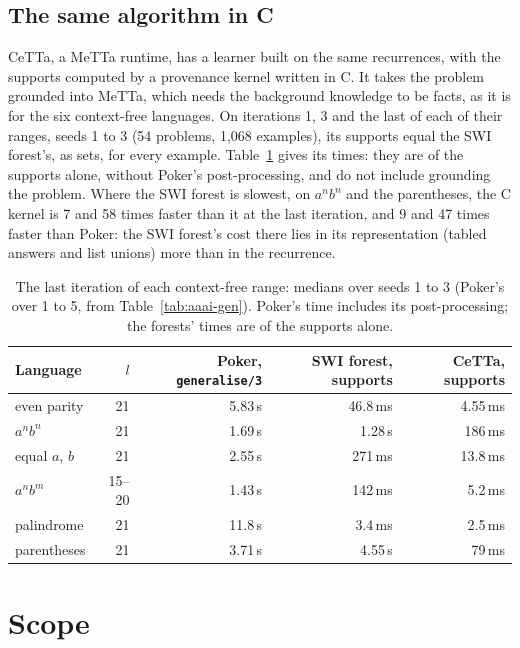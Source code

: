 \documentclass[11pt]{article}
\begin{document}
\subsection{The same algorithm in C}

CeTTa, a MeTTa runtime, has a learner built on the same recurrences, with the
supports computed by a provenance kernel written in C. It takes the problem grounded
into MeTTa, which needs the background knowledge to be facts, as it is for the six
context-free languages. On iterations 1, 3 and the last of each of their ranges,
seeds 1 to 3 (54 problems, 1,068 examples), its supports equal the SWI forest's,
as sets, for every example. Table~\ref{tab:cetta} gives its times: they are of the
supports alone, without Poker's post-processing, and do not include grounding the
problem. Where the SWI forest is slowest, on $a^nb^n$ and the parentheses, the C
kernel is 7 and 58 times faster than it at the last iteration, and 9 and 47 times
faster than Poker: the SWI forest's cost there lies in its representation (tabled
answers and list unions) more than in the recurrence.

\begin{table}[ht]
\centering
\small
\begin{tabular}{lrrrr}
\toprule
Language & $l$ & Poker, \nolinkurl{generalise/3} & SWI forest, supports & CeTTa, supports\\
\midrule
even parity    & 21 & 5.83\,s & 46.8\,ms & 4.55\,ms\\
$a^nb^n$       & 21 & 1.69\,s & 1.28\,s  & 186\,ms\\
equal $a$, $b$ & 21 & 2.55\,s & 271\,ms  & 13.8\,ms\\
$a^nb^m$       & 15--20 & 1.43\,s & 142\,ms  & 5.2\,ms\\
palindrome     & 21 & 11.8\,s & 3.4\,ms  & 2.5\,ms\\
parentheses    & 21 & 3.71\,s & 4.55\,s  & 79\,ms\\
\bottomrule
\end{tabular}
\caption{The last iteration of each context-free range: medians over seeds 1 to 3
(Poker's over 1 to 5, from Table~\ref{tab:aaai-gen}). Poker's time includes its
post-processing; the forests' times are of the supports alone.}
\label{tab:cetta}
\end{table}


\section{Scope}
\end{document}
